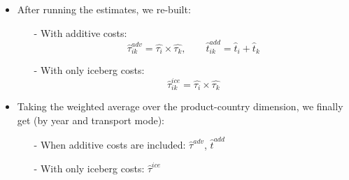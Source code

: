 \documentclass[10 pt,Helvetica, french]{beamer}
\begin{document}
\begin{frame}
\begin{itemize}
\item After running the estimates, we re-built: \vspace{0.1cm}
\begin{itemize}
\item[-] With additive costs:
$$\widehat{\tau}^{adv}_{ik} = \widehat{\tau_{i}} \times \widehat{\tau_{k}}, \qquad \widehat{t}^{add}_{ik} = \widehat{t}_{i} + \widehat{t}_{k}$$
\item[-] With only iceberg costs:
$$\widehat{\tau}^{ice}_{ik} = \widehat{\tau_{i}} \times \widehat{\tau_{k}}$$
\end{itemize}
\item  Taking the weighted average over the product-country dimension, we finally get (by year and transport mode): \vspace{0.1cm}
\begin{itemize}
\item[-] When additive costs are included: $\widehat{\tau}^{adv}$, $\widehat{t}^{add}$  \vspace{0.1cm}
\item[-] With only iceberg costs: $\widehat{\tau}^{ice}$
\end{itemize}
\end{itemize}
\end{frame}
\end{document}
